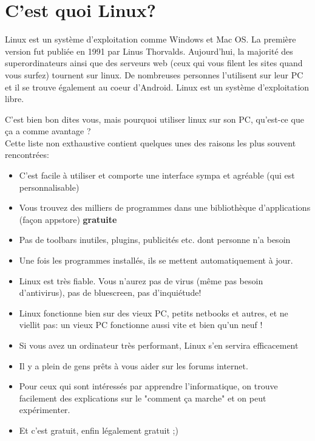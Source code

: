 \documentclass[11pt]{../fiche}
\begin{document}

\section*{C'est quoi Linux?}

Linux est un système d'exploitation comme Windows et Mac OS. La première version fut publiée en 1991 par Linus Thorvalds.
Aujourd'hui, la majorité des superordinateurs ainsi que des serveurs web (ceux qui vous filent les sites quand vous surfez)
tournent sur linux. De nombreuses personnes l'utilisent sur leur PC et il se trouve également au coeur d'Android.
Linux est un système d'exploitation libre.
\vspace{0.5cm}

C'est bien bon dites vous, mais pourquoi utiliser linux sur son PC, qu'est-ce que ça a comme avantage ?\\
Cette liste non exthaustive contient quelques unes des raisons les plus souvent rencontrées:
\begin{itemize}
    \item C'est facile à utiliser et comporte une interface sympa et agréable (qui est personnalisable)
    \item Vous trouvez des milliers de programmes dans une bibliothèque d'applications (façon appstore) \textbf{gratuite}
    \item Pas de toolbars inutiles, plugins, publicités etc. dont personne n'a besoin
    \item Une fois les programmes installés, ils se mettent automatiquement à jour.
    \item Linux est très fiable. Vous n'aurez pas de virus (même pas besoin d'antivirus),
        pas de bluescreen, pas d'inquiétude!
    \item Linux fonctionne bien sur des vieux PC, petits netbooks et autres, et
        ne viellit pas: un vieux PC fonctionne aussi vite et bien qu'un neuf !
    \item Si vous avez un ordinateur très performant, Linux s'en servira efficacement
    \item Il y a plein de gens prêts à vous aider sur les forums internet.
    \item Pour ceux qui sont intéressés par apprendre l'informatique, on trouve
        facilement des explications sur le "comment ça marche" et on peut
        expérimenter.
    \item Et c'est gratuit, enfin légalement gratuit ;)
\end{itemize}
\end{document}
